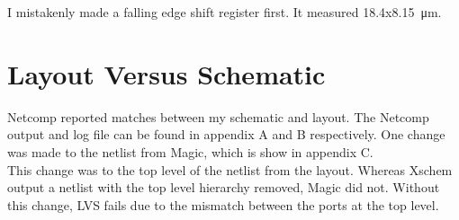 \documentclass[11pt]{article}
\begin{document}
I mistakenly made a falling edge shift register first. It measured 18.4x\qty{8.15}{\micro\meter}.



\section*{Layout Versus Schematic}

Netcomp reported matches between my schematic and layout. The Netcomp output and log file can be found in appendix A and B respectively. One change was made to the netlist from Magic, which is show in appendix C. \\

This change was to the top level of the netlist from the layout. Whereas Xschem output a netlist with the top level hierarchy removed, Magic did not. Without this change, LVS fails due to the mismatch between the ports at the top level.




\newpage
\end{document}
